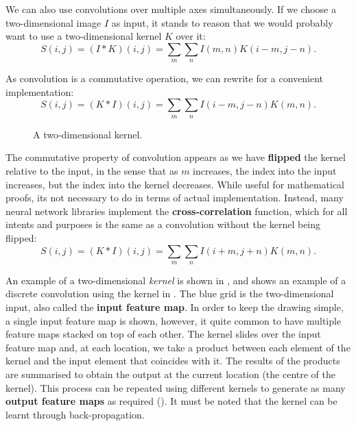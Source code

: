 We can also use convolutions over multiple axes simultaneously. If we choose a two-dimensional image $I$ as input, it stands to reason that we would probably want to use a two-dimensional kernel $K$ over it:
\begin{equation}
\label{eqn:convolution-2d}
S(i, j)=(I * K)(i, j)=\sum_{m} \sum_{n} I(m, n) K(i-m, j-n).
\end{equation}

As convolution is a commutative operation, we can rewrite  for a convenient implementation:
\begin{equation}
S(i, j)=(K * I)(i, j)=\sum_{m} \sum_{n} I(i-m, j-n) K(m, n).
\end{equation}

\begin{figure}
    \centering
    
    \caption{A two-dimensional kernel.}
    \label{fig:2d-kernel-sample}
\end{figure}

The commutative property of convolution appears as we have \textbf{flipped} the kernel relative to the input, in the sense that as $m$ increases, the index into the input increases, but the index into the kernel decreases. While useful for mathematical proofs, its not necessary to do in terms of actual implementation. Instead, many neural network libraries implement the \textbf{cross-correlation} function, which for all intents and purposes is the same as a convolution without the kernel being flipped:
\begin{equation}
S(i, j)=(K * I)(i, j)=\sum_{m} \sum_{n} I(i+m, j+n) K(m, n).
\end{equation}\label{eqn:conv-2d-cross-correl}

An example of a two-dimensional \textit{kernel} is shown in , and  shows an example of a discrete convolution using the kernel in . 
The blue grid is the two-dimensional input, also called the \textbf{input feature map}. In order to keep the drawing simple, a single input feature map is shown, however, it quite common to have multiple feature maps stacked on top of each other.
The kernel slides over the input feature map and, at each location, we take a product between each element of the kernel and the input element that coincides with it.
The results of the products are summarised to obtain the output at the current location (the centre of the kernel).
This process can be repeated using different kernels to generate as many \textbf{output feature maps} as required (). It must be noted that the kernel can be learnt through back-propagation.

